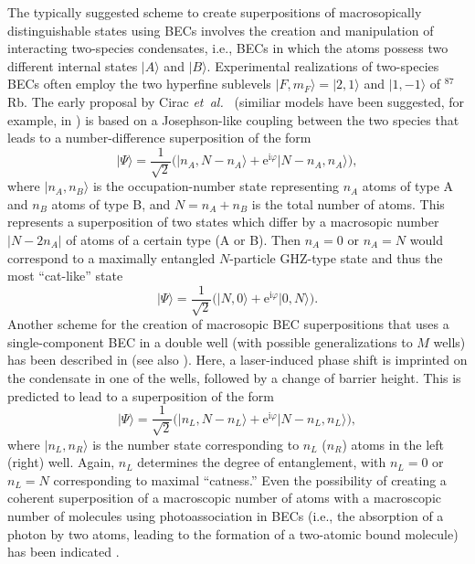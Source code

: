 \documentclass[twocolumn,aps,floatfix,amsmath,amssymb,showpacs,nofootinbib]{revtex4}
\newcommand{\be}{\begin{equation}} \newcommand{\ee}{\end{equation}}
\newcommand{\etal}{\emph{et~al.\ }}
\newcommand{\ket}[1]{\ensuremath{|{#1\rangle}}}
\newcommand{\e}{\ensuremath{\mathrm{e}}}
\begin{document}
The typically suggested scheme to create superpositions of
macrosopically distinguishable states using BECs involves the creation
and manipulation of interacting two-species condensates, i.e., BECs in
which the atoms possess two different internal states $\ket{A}$ and
$\ket{B}$. Experimental realizations of two-species BECs often employ
the two hyperfine sublevels $\ket{F,m_F} = \ket{2,1}$ and $\ket{1,-1}$
of $^{87}$Rb. The early proposal by Cirac \etal \cite{Cirac:1998:mm}
(similiar models have been suggested, for
example, in \cite{Ruostekoski:1998:mm,Gordon:1999:mh,%
  Dunningham:2001:da,Micheli:2003:jn,Jack:2005:oo}) is based on a Josephson-like
coupling between the two species that leads to a number-difference
superposition of the form
%
\be \label{eq:bec-cat1}
\ket{\Psi} = \frac{1}{\sqrt{2}} \bigl( \ket{n_A,N-n_A} + \e^{\mathrm{i}\varphi}
\ket{N-n_A,n_A} \bigr),
\ee 
%
where $\ket{n_A, n_B}$ is the occupation-number state representing
$n_A$ atoms of type A and $n_B$ atoms of type B, and $N=n_A+n_B$ is
the total number of atoms. This represents a superposition of two
states which differ by a macrosopic number $|N-2n_A|$ of atoms of a
certain type (A or B). Then $n_A=0$ or $n_A=N$ would correspond to a
maximally entangled $N$-particle GHZ-type state
\cite{Greenberger:1990:bw} and thus the most ``cat-like'' state
%
\be \label{eq:bec-cat2}
\ket{\Psi} = \frac{1}{\sqrt{2}} \bigl( \ket{N,0} + \e^{\mathrm{i}\varphi}
\ket{0,N} \bigr).
\ee 
%
Another scheme for the creation of macrosopic BEC superpositions that
uses a single-component BEC in a double well (with possible
generalizations to $M$ wells) has been described in
\cite{Mahmud:2004:rz,Mahmud:2005:rz} (see also
\cite{Polkovnikov:2002:ii,Polkovnikov:2003:ll}).  Here, a
laser-induced phase shift is imprinted on the condensate in one of the
wells, followed by a change of barrier height. This is predicted to
lead to a superposition of the form
%
\be\label{eq:bec-cat3}
\ket{\Psi} = \frac{1}{\sqrt{2}} \bigl( \ket{n_L,N-n_L} + \e^{\mathrm{i}\varphi}
\ket{N-n_L,n_L} \bigr), 
\ee
%
where $\ket{n_L,n_R}$ is the number state corresponding to $n_L$
($n_R$) atoms in the left (right) well. Again, $n_L$ determines the
degree of entanglement, with $n_L=0$ or $n_L=N$ corresponding to
maximal ``catness.''  Even the possibility of creating a coherent
superposition of a macroscopic number of atoms with a macroscopic
number of molecules using photoassociation in BECs (i.e., the
absorption of a photon by two atoms, leading to the formation of a
two-atomic bound molecule) has been indicated
\cite{Calsamiglia:2001:tt}.
\end{document}
